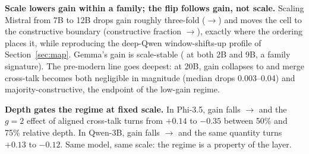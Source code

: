 \documentclass[preprint,12pt]{elsarticle}
\begin{document}
\begin{table}[t]
{
}
\end{table}

\textbf{Scale lowers gain within a family; the flip follows gain, not scale.} Scaling
Mistral from 7B to 12B drops gain roughly three-fold (\gainMistralSevenB{}$\to$\gainNemoTwelveB{})
and moves the cell to the constructive boundary (constructive fraction
\fracMistralSevenB{}$\to$\fracNemoTwelveB{}), exactly where the ordering places it, while
reproducing the deep-Qwen window-shifts-up profile of Section~\ref{sec:map}. Gemma's gain is
scale-stable (\gainGemmaNineB{} at both 2B and 9B, a family signature). The pre-modern line
goes deepest: at 20B, gain collapses to \gainNeoxTwentyB{} and merge cross-talk becomes both
negligible in magnitude (median drops 0.003--0.04) and majority-constructive, the endpoint of
the low-gain regime.

\textbf{Depth gates the regime at fixed scale.} In Phi-3.5, gain falls
\phiGainShallow{}$\to$\phiGainDeep{} and the $g{=}2$ effect of aligned cross-talk turns from
$+0.14$ to $-0.35$ between 50\% and 75\% relative depth. In Qwen-3B, gain falls
\qwenThreeBGainShallow{}$\to$\qwenThreeBGainDeep{} and the same quantity turns $+0.13$ to
$-0.12$. Same model, same scale: the regime is a property of the layer.
\end{document}
